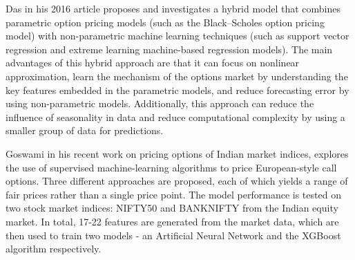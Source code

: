 Das in his 2016 article\cite{10.1007/s00521-016-2303-y} proposes and investigates a hybrid model that combines parametric option pricing models (such as the Black–Scholes option pricing model) with non-parametric machine learning techniques (such as support vector regression and extreme learning machine-based regression models). The main advantages of this hybrid approach are that it can focus on nonlinear approximation, learn the mechanism of the options market by understanding the key features embedded in the parametric models, and reduce forecasting error by using non-parametric models. Additionally, this approach can reduce the influence of seasonality in data and reduce computational complexity by using a smaller group of data for predictions.


Goswami\cite{Goswami2020DatadrivenOP} in his recent work on pricing options of Indian market indices, explores the use of supervised machine-learning algorithms to price European-style call options. Three different approaches are proposed, each of which yields a range of fair prices rather than a single price point. The model performance is tested on two stock market indices: NIFTY50 and BANKNIFTY from the Indian equity market. In total, 17-22 features are generated from the market data, which are then used to train two models - an Artificial Neural Network and the XGBoost algorithm respectively.